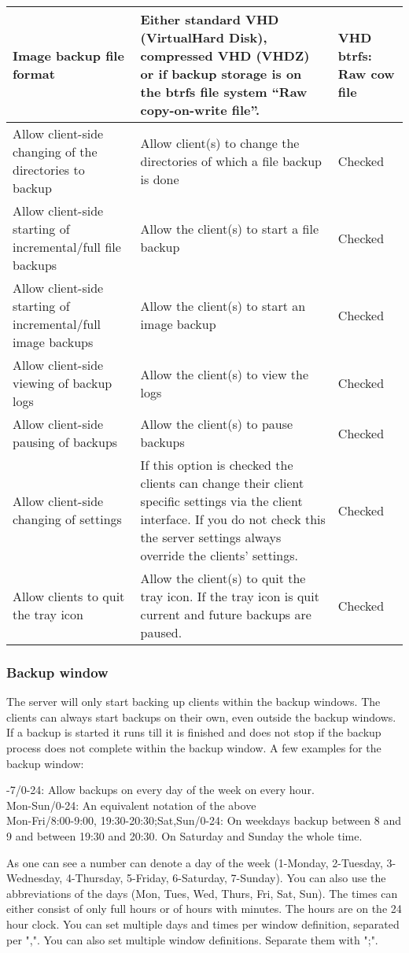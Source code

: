 \documentclass[a4paper,10pt]{article}
\begin{document}
\begin{longtable}{|p{}|p{}|p{}|}
\hline
Image backup file format & Either standard VHD (VirtualHard Disk), compressed VHD (VHDZ) or if backup storage is on the btrfs file system ``Raw copy-on-write file''. & VHD btrfs: Raw cow file\\
\hline
Allow client-side changing of the directories to backup & Allow client(s) to change the directories of which a file backup is done & Checked \\
\hline
Allow client-side starting of incremental/full file backups & Allow the client(s) to start a file backup & Checked \\
\hline
Allow client-side starting of incremental/full image backups & Allow the client(s) to start an image backup & Checked \\
\hline
Allow client-side viewing of backup logs & Allow the client(s) to view the logs & Checked \\
\hline
Allow client-side pausing of backups & Allow the client(s) to pause backups & Checked \\
\hline
Allow client-side changing of settings & If this option is checked the clients can change their client specific settings via the client interface. If you do not check this the server settings always override the clients' settings. & Checked\\
\hline
Allow clients to quit the tray icon & Allow the client(s) to quit the tray icon. If the tray icon is quit current and future backups are paused. & Checked \\
\hline
\end{longtable}

\subsubsection{Backup window}
\label{subsub_backup_window}

The server will only start backing up clients within the backup windows. The clients can always start backups on their own, even outside the backup windows. If a backup is started it runs till it is finished and does not stop if the backup process does not complete within the backup window. A few examples for the backup window:
\par\null\par
{}-7/0-24: Allow backups on every day of the week on every hour.\\
Mon-Sun/0-24: An equivalent notation of the above\\
Mon-Fri/8:00-9:00, 19:30-20:30;Sat,Sun/0-24: On weekdays backup between 8 and 9 and between 19:30 and 20:30. On Saturday and Sunday the whole time.
\par\null\par
As one can see a number can denote a day of the week (1-Monday, 2-Tuesday, 3-Wednesday, 4-Thursday, 5-Friday, 6-Saturday, 7-Sunday). You can also use the abbreviations of the days (Mon, Tues, Wed, Thurs, Fri, Sat, Sun). The times can either consist of only full hours or of hours with minutes. The hours are on the 24 hour clock. You can set multiple days and times per window definition, separated per ",". You can also set multiple window definitions. Separate them with ";".
\end{document}
